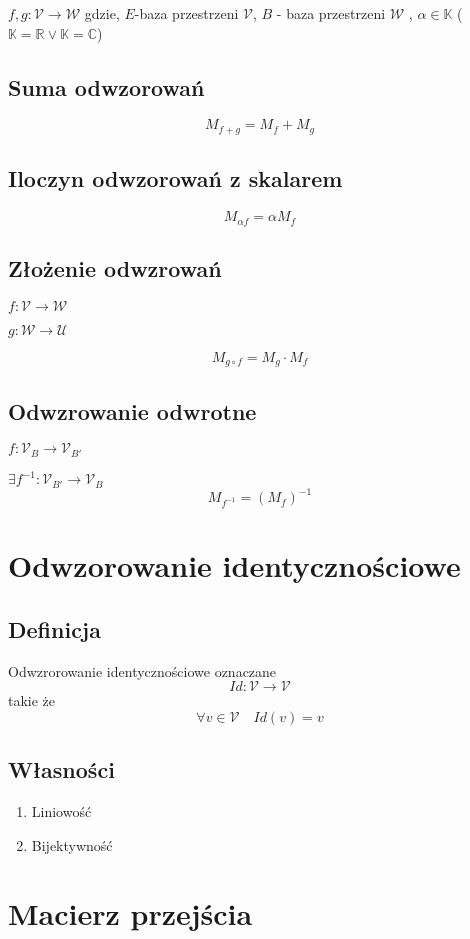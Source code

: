 \documentclass[11pt]{article}
\begin{document}
$f,g : \mathcal{V} \to \mathcal{W} $ gdzie, $E$-baza przestrzeni $\mathcal{V}$, $B$ - baza przestrzeni $\mathcal{W}$ , $\alpha \in \mathbb{K}$ ( $\mathbb{K} = \mathbb{R} \vee \mathbb{K} = \mathbb{C}$)

\subsection{Suma odwzorowań}
$$ M_{f+g} = M_f + M_g$$
\subsection{Iloczyn odwzorowań z skalarem}
$$ M_{\alpha f} = \alpha M_f $$
\subsection{Złożenie odwzrowań}
$ f : \mathcal{V} \to \mathcal{W} $

$ g : \mathcal{W} \to \mathcal{U} $

$$ M_{g \circ f} = M_g \cdot M_f $$

\subsection{Odwzrowanie odwrotne}
$ f : \mathcal{V}_{B} \to \mathcal{V}_{B'} $

$ \exists f^{-1} : \mathcal{V}_{B'} \to \mathcal{V}_{B} $
$$ M_{f^{-1}} = (M_f)^{-1} $$

\section{Odwzorowanie identycznościowe}
\subsection{Definicja} 
Odwzrorowanie identycznościowe oznaczane $$ Id : \mathcal{V} \to \mathcal{V} $$ takie że 
$$ \forall v \in \mathcal{V} \quad Id(v) = v $$
\subsection{Własności}
\begin{enumerate}
\item{Liniowość}
\item{Bijektywność}
\end{enumerate}

\section{Macierz przejścia}
\end{document}
